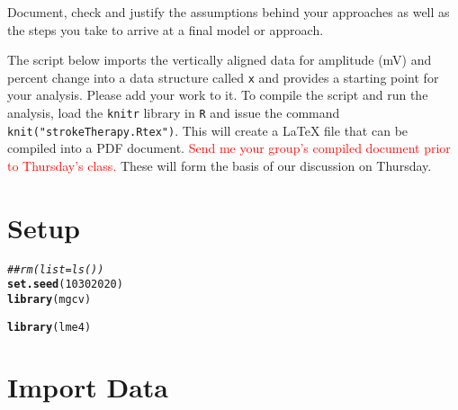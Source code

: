 \documentclass[11pt]{article}\usepackage[]{graphicx}\usepackage[]{color}
\makeatletter
\newcommand{\hlnum}[1]{\textcolor[rgb]{0.686,0.059,0.569}{#1}}%
\newcommand{\hlcom}[1]{\textcolor[rgb]{0.678,0.584,0.686}{\textit{#1}}}%
\newcommand{\hlstd}[1]{\textcolor[rgb]{0.345,0.345,0.345}{#1}}%
\newcommand{\hlkwd}[1]{\textcolor[rgb]{0.737,0.353,0.396}{\textbf{#1}}}%
\newenvironment{kframe}{%
 \def\at@end@of@kframe{}%
 \ifinner\ifhmode%
  \def\at@end@of@kframe{\end{minipage}}%
  \begin{minipage}{\columnwidth}%
 \fi\fi%
 \def\FrameCommand##1{\hskip\@totalleftmargin \hskip-\fboxsep
 \colorbox{shadecolor}{##1}\hskip-\fboxsep
     \hskip-\linewidth \hskip-\@totalleftmargin \hskip\columnwidth}%
 \MakeFramed {\advance\hsize-\width
   \@totalleftmargin\z@ \linewidth\hsize
   \@setminipage}}%
 {\par\unskip\endMakeFramed%
 \at@end@of@kframe}
\newenvironment{knitrout}{}{} %
\makeatother
\begin{document}
Document, check and justify the assumptions behind your approaches as
well as the steps you take to arrive at a final model or approach.

The script below imports the vertically aligned data for amplitude
(mV) and percent change into a data structure called \texttt{x} and
provides a starting point for your analysis.  Please add your work to
it.  To compile the script and run the analysis, load the
\texttt{knitr} library in \texttt{R} and issue the command
\texttt{knit("strokeTherapy.Rtex")}.  This will create a LaTeX file
that can be compiled into a PDF document.  {\textcolor{red}{Send me
    your group's compiled document prior to Thursday's class.}}  These
will form the basis of our discussion on Thursday.

\section{Setup}



\begin{knitrout}
\color{fgcolor}\begin{kframe}
\begin{alltt}
\hlcom{##rm(list=ls())}
\hlkwd{set.seed}\hlstd{(}\hlnum{10302020}\hlstd{)}
\hlkwd{library}\hlstd{(mgcv)}
\end{alltt}


{\ttfamily\noindent\itshape\color{messagecolor}{\#\# Loading required package: nlme}}

{\ttfamily\noindent\itshape{}}\begin{alltt}
\hlkwd{library}\hlstd{(lme4)}
\end{alltt}


{\ttfamily\noindent\itshape\color{messagecolor}{\#\# Loading required package: Matrix}}

{\ttfamily\noindent\itshape\color{messagecolor}{\#\# \\\#\# Attaching package: 'lme4'}}

{\ttfamily\noindent\itshape\color{messagecolor}{\#\# The following object is masked from 'package:nlme':\\\#\# \\\#\#\ \ \ \  lmList}}\end{kframe}
\end{knitrout}

\section{Import Data}
\end{document}

